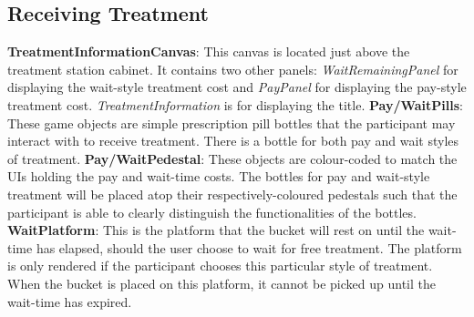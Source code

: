 \documentclass{article}
\begin{document}
\subsection{Receiving Treatment}
\textbf{TreatmentInformationCanvas}: This canvas is located just above the treatment station cabinet. It contains two other panels: \textit{WaitRemainingPanel} for displaying the wait-style treatment cost and \textit{PayPanel} for displaying the pay-style treatment cost. \textit{TreatmentInformation} is for displaying the title. \newline \newline
\textbf{Pay\slash WaitPills}: These game objects are simple prescription pill bottles that the participant may interact with to receive treatment. There is a bottle for both pay and wait styles of treatment. \newline \newline
\textbf{Pay\slash WaitPedestal}: These objects are colour-coded to match the UIs holding the pay and wait-time costs. The bottles for pay and wait-style treatment will be placed atop their respectively-coloured pedestals such that the participant is able to clearly distinguish the functionalities of the bottles. \newline \newline
\textbf{WaitPlatform}: This is the platform that the bucket will rest on until the wait-time has elapsed, should the user choose to wait for free treatment. The platform is only rendered if the participant chooses this particular style of treatment. When the bucket is placed on this platform, it cannot be picked up until the wait-time has expired.
\end{document}

